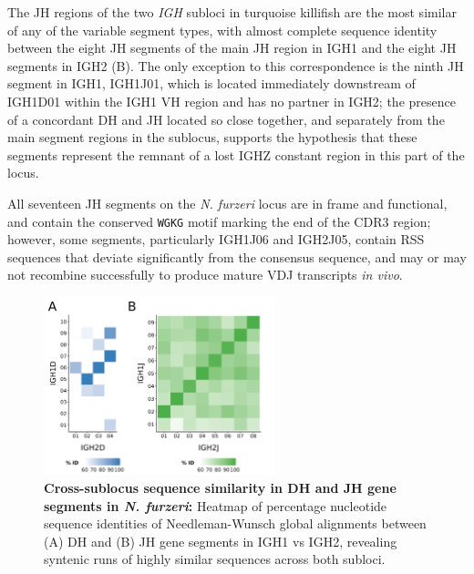 	The JH regions of the two \textit{IGH} subloci in turquoise killifish are the most similar of any of the variable segment types, with almost complete sequence identity between the eight JH segments of the main JH region in IGH1 and the eight JH segments in IGH2 (B). The only exception to this correspondence is the ninth JH segment in IGH1, IGH1J01, which is located immediately downstream of IGH1D01 within the IGH1 VH region and has no partner in IGH2; the presence of a concordant DH and JH located so close together, and separately from the main segment regions in the sublocus, supports the hypothesis that these segments represent the remnant of a lost IGHZ constant region in this part of the locus.
	
	All seventeen JH segments on the \textit{N. furzeri} locus are in frame and functional, and contain the conserved \texttt{WGKG} motif marking the end of the CDR3 region; however, some segments, particularly IGH1J06 and IGH2J05, contain RSS sequences that deviate significantly from the consensus sequence, and may or may not recombine successfully to produce mature VDJ transcripts \textit{in vivo}. %
		

	

\begin{figure}
\centering
\includegraphics[width=0.6\textwidth]{_Figures/png/nfu-dj-aln}
\caption[Cross-sublocus sequence similarity in DH and JH gene segments in \textit{N. furzeri}]{\textbf{Cross-sublocus sequence similarity in DH and JH gene segments in \textit{N. furzeri}:} Heatmap of percentage nucleotide sequence identities of Needleman-Wunsch global alignments between (A) DH and (B) JH gene segments in IGH1 vs IGH2, revealing syntenic runs of highly similar sequences across both subloci.}
\label{fig:nfu-dj-alignment}
\end{figure}


